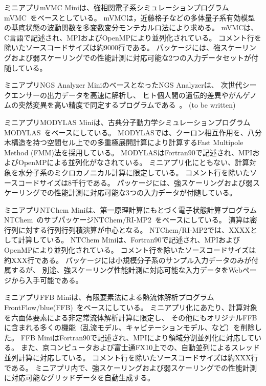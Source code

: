 ミニアプリmVMC Miniは、強相関電子系シミュレーションプログラムmVMC~\cite{mVMC_url}\cite{mVMC_tahara2008}をベースとしている。
mVMCは，近藤格子などの多体量子系有効模型の基底状態の波動関数を多変数変分モンテカルロ法により求める。
mVMCは、C言語で記述され、MPIおよびOpenMPにより並列化されている。
コメント行を除いたソースコードサイズは約9000行である。
パッケージには、強スケーリングおよび弱スケーリングでの性能計測に対応可能な2つの入力データセットが付随している。

ミニアプリNGS Analyzer MiniのベースとなったNGS Analyzerは、
次世代シークエンサーの出力データを高速に解析し、
ヒト個人間の遺伝的差異やがんゲノムの突然変異を高い精度で同定するプログラムである~\cite{NGSA_url}。
(to be written)

ミニアプリMODYLAS Miniは、古典分子動力学シミュレーションプログラムMODYLAS~\cite{Modylas_url}\cite{Modylas_andoh2013}をベースにしている。
MODYLASでは、クーロン相互作用を、八分木構造を持つ空間セル上での多重極展開計算により計算するFast Multipole Method (FMM)法を採用している。
MODYLASはFortran90で記述され、MPIおよびOpenMPによる並列化がなされている。
ミニアプリ化にともない、計算対象を水分子系のミクロカノニカル計算に限定している。
コメント行を除いたソースコードサイズは8千行である。
パッケージには、強スケーリングおよび弱スケーリングでの性能計測に対応可能な3つの入力データが付随している。

ミニアプリNTChem Miniは、第一原理計算にもとづく電子状態計算プログラムNTChem~\cite{NTChem_url}のサブパッケージNTChem/RI-MP2~\cite{NTChem_katouda2013}をベースにしている。
演算は密行列に対する行列行列積演算が中心となる。
NTChem/RI-MP2では、XXXXとして計算している。
NTChem Miniは、Fortran90で記述され、MPIおよびOpenMPにより並列化されている。
コメント行を除いたソースコードサイズは約XXX行である。
パッケージには小規模分子系のサンプル入力データのみが付属するが、
別途、強スケーリング性能計測に対応可能な入力データをWebページから入手可能である。

ミニアプリFFB Miniは、有限要素法による熱流体解析プログラムFrontFlow/blue(FFB)~\cite{FFB_minami2012}\cite{FFB_kumahata2013}をベースにしている。
ミニアプリ化にあたり、計算対象を六面体要素による非定常流体解析計算に限定し、
その他にもオリジナルFFBに含まれる多くの機能（乱流モデル、キャビテーションモデル、など）を削除した。
FFB MiniはFortran90で記述され、MPIにより領域分割並列化に対応している。
また、京コンピュータおよび富士通FX10上での、自動並列によるスレッド並列計算に対応している。
コメント行を除いたソースコードサイズは約XXX行である。
ミニアプリ内で、強スケーリングおよび弱スケーリングでの性能計測に対応可能なグリッドデータを自動生成する。




\nocite{*}



